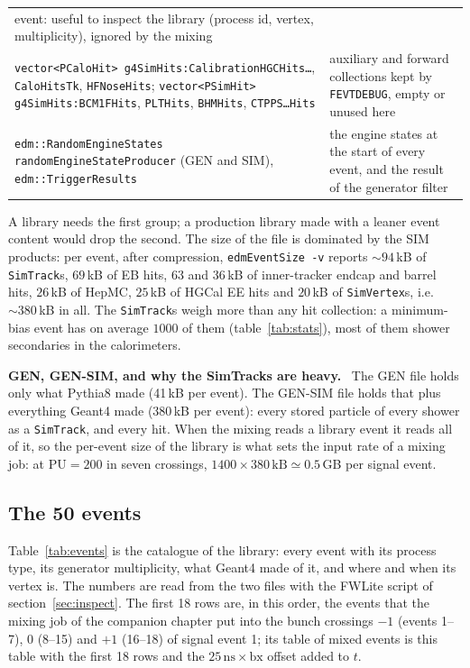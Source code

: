 \documentclass[11pt,a4paper]{article}
\newcommand{\code}[1]{\texttt{#1}}
\newcommand{\bx}{\ensuremath{\mathrm{bx}}}
\newcommand{\ns}{\,\mathrm{ns}}
\newenvironment{plainwords}[1][In plain words]{%
  \par\medskip\noindent\setlength{\fboxsep}{6pt}\setlength{\fboxrule}{0.6pt}%
  \begin{lrbox}{\plainbox}\begin{minipage}{\dimexpr\textwidth-2\fboxsep-2\fboxrule\relax}\small
  \textbf{\textcolor{plainrule}{#1.}}\ \ignorespaces}{%
  \end{minipage}\end{lrbox}\noindent\fcolorbox{plainrule}{plainbg}{\usebox{\plainbox}}\par\medskip}
\begin{document}
\begin{center}
\begin{tabularx}{\textwidth}{>{\raggedright\arraybackslash\hyphenpenalty=10000}p{70mm}X}
  event: useful to inspect the library (process id, vertex, multiplicity), ignored by the mixing \\
\code{vector<PCaloHit> g4SimHits:CalibrationHGCHits\ldots}, \code{CaloHitsTk}, \code{HFNoseHits}; \code{vector<PSimHit> g4SimHits:BCM1FHits}, \code{PLTHits}, \code{BHMHits}, \code{CTPPS\ldots{}Hits} & auxiliary
  and forward collections kept by \code{FEVTDEBUG}, empty or unused here \\
\code{edm::RandomEngineStates randomEngineStateProducer} (GEN and SIM), \code{edm::TriggerResults} & the
  engine states at the start of every event, and the result of the generator filter \\
\bottomrule
\end{tabularx}
\end{center}
A library needs the first group; a production library made with a leaner event content would drop the
second. The size of the file is dominated by the SIM products: per event, after compression,
\code{edmEventSize -v} reports $\sim94$\,kB of \code{SimTrack}s, $69$\,kB of EB hits, $63$ and $36$\,kB of
inner-tracker endcap and barrel hits, $26$\,kB of HepMC, $25$\,kB of HGCal EE hits and $20$\,kB of
\code{SimVertex}s, i.e.\ $\sim380$\,kB in all. The \code{SimTrack}s weigh more than any hit collection: a
minimum-bias event has on average $1000$ of them (table~\ref{tab:stats}), most of them shower secondaries
in the calorimeters.

\begin{plainwords}[GEN, GEN-SIM, and why the SimTracks are heavy]
The GEN file holds only what Pythia8 made (41\,kB per event). The GEN-SIM file holds that plus everything
Geant4 made (380\,kB per event): every stored particle of every shower as a \code{SimTrack}, and every hit.
When the mixing reads a library event it reads all of it, so the per-event size of the library is what sets
the input rate of a mixing job: at $\mathrm{PU}=200$ in seven crossings, $1400\times380\,\mathrm{kB}
\simeq 0.5$\,GB per signal event.
\end{plainwords}

\subsection{The 50 events}
\label{sec:events}

Table~\ref{tab:events} is the catalogue of the library: every event with its process type, its generator
multiplicity, what Geant4 made of it, and where and when its vertex is. The numbers are read from the two
files with the FWLite script of section~\ref{sec:inspect}. The first 18 rows are, in this order, the events
that the mixing job of the companion chapter put into the bunch crossings $-1$ (events 1--7), $0$ (8--15)
and $+1$ (16--18) of signal event 1; its table of mixed events is this table with the first 18 rows and the
$25\ns\times\bx$ offset added to $t$.
\end{document}
